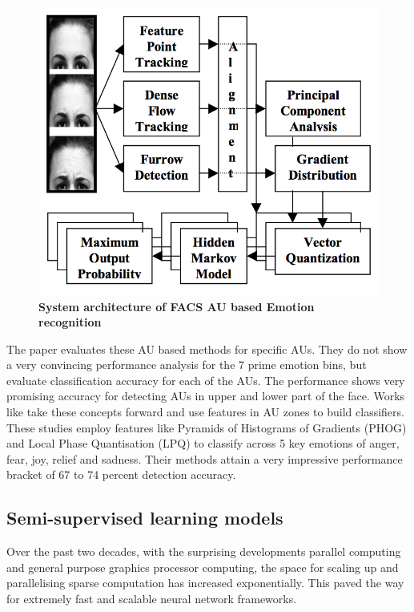 \begin{figure}
\centering
\includegraphics[width=\columnwidth]{figures/FAU_Kanade}
\caption{\textbf{System architecture of FACS AU based Emotion recognition}}
\label{fig:FACSAU}
\end{figure}

The paper evaluates these AU based methods for specific AUs. They do not show a very convincing performance analysis for the 7 prime emotion bins, but evaluate classification accuracy for each of the AUs. The performance shows very promising accuracy for detecting AUs in upper and lower part of the face. Works like \cite{1027968} \cite{5771366} take these concepts forward and use features in AU zones to build classifiers. These studies employ features like Pyramids of Histograms of Gradients (PHOG) and Local Phase Quantisation (LPQ) to classify across 5 key emotions of anger, fear, joy, relief and sadness. Their methods attain a very impressive performance bracket of 67 to 74 percent detection accuracy.

\subsection{ Semi-supervised learning models }
Over the past two decades, with the surprising developments parallel computing and general purpose graphics processor computing, the space for scaling up and parallelising sparse computation has increased exponentially. This paved the way for extremely fast and scalable neural network frameworks. 